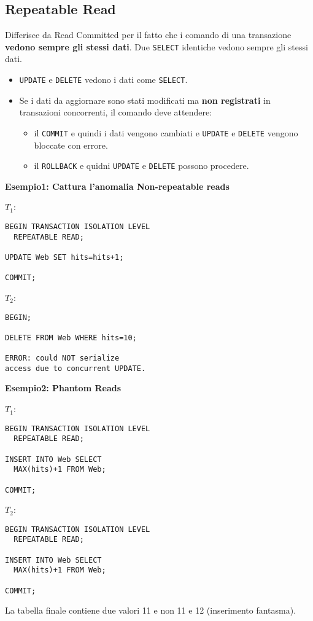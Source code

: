 \documentclass[a4paper, 10pt]{article}
\begin{document}
		\subsection{Repeatable Read}
			Differisce da Read Committed per il fatto che i comando di una transazione \textbf{vedono sempre gli stessi dati}. Due \lstinline|SELECT| identiche vedono sempre gli stessi dati.
			\begin{itemize}
				\item \lstinline|UPDATE| e \lstinline|DELETE| vedono i dati come \lstinline|SELECT|.
				\item Se i dati da aggiornare sono stati modificati ma \textbf{non registrati} in transazioni concorrenti, il comando deve attendere: 
				\begin{itemize}
					\item il \lstinline|COMMIT| e quindi i dati vengono cambiati e \lstinline|UPDATE| e \lstinline|DELETE| vengono bloccate con errore.
					\item il \lstinline|ROLLBACK| e quidni \lstinline|UPDATE| e \lstinline|DELETE| possono procedere.
				\end{itemize}
			\end{itemize}
			\textbf{Esempio1: Cattura l'anomalia Non-repeatable reads}
			\begin{multicols}{2}
			\noindent
			$ T_1 $:
			\begin{lstlisting}
BEGIN TRANSACTION ISOLATION LEVEL
  REPEATABLE READ;

UPDATE Web SET hits=hits+1;

COMMIT;
			\end{lstlisting}
			\columnbreak
			$ T_2 $:
			\begin{lstlisting}
BEGIN;

DELETE FROM Web WHERE hits=10;

ERROR: could NOT serialize 
access due to concurrent UPDATE.
			\end{lstlisting}
			\end{multicols}
			\noindent
			\textbf{Esempio2: Phantom Reads}
			\begin{multicols}{2}
			\noindent
			$ T_1 $:
			\begin{lstlisting}
BEGIN TRANSACTION ISOLATION LEVEL
  REPEATABLE READ;
 
INSERT INTO Web SELECT
  MAX(hits)+1 FROM Web;
  
COMMIT;
			\end{lstlisting}
			\columnbreak
			$ T_2 $:
			\begin{lstlisting}
BEGIN TRANSACTION ISOLATION LEVEL
  REPEATABLE READ;

INSERT INTO Web SELECT
  MAX(hits)+1 FROM Web;

COMMIT;
			\end{lstlisting}
			\end{multicols}
		La tabella finale contiene due valori 11 e non 11 e 12 (inserimento fantasma).
		
\end{document}
